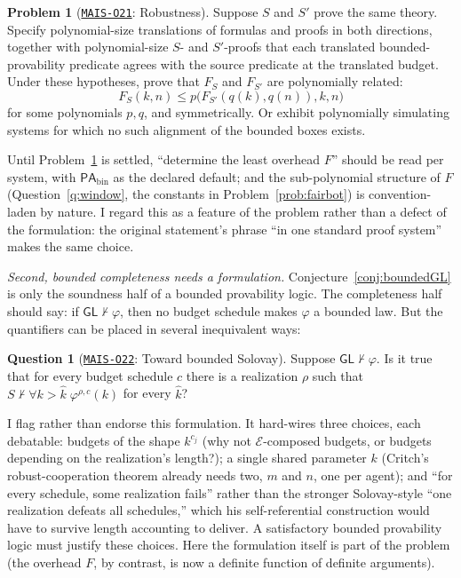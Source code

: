 \documentclass[11pt]{amsart}
\newcommand{\Oid}[1]{\href{https://github.com/lionellevine/MAIS/blob/main/open-problems/MAIS-O#1.md}{\texttt{MAIS-O#1}}}
\theoremstyle{plain}
\theoremstyle{definition}
\newtheorem{problem}[theorem]{Problem}
\newtheorem{question}[theorem]{Question}
\newcommand{\PAbin}{\mathsf{PA}_{\mathrm{bin}}}
\newcommand{\GL}{\mathsf{GL}}
\begin{document}
\begin{problem}[\Oid{21}: Robustness]
\label{prob:robust}
Suppose $S$ and $S'$ prove the same theory. Specify polynomial-size translations of formulas and proofs in both directions, together with polynomial-size $S$- and $S'$-proofs that each translated bounded-provability predicate agrees with the source predicate at the translated budget. Under these hypotheses, prove that $F_S$ and $F_{S'}$ are polynomially related:
\[
F_S(k,n)\le p\bigl(F_{S'}(q(k),q(n)),k,n\bigr)
\]
for some polynomials $p,q$, and symmetrically. Or exhibit polynomially simulating systems for which no such alignment of the bounded boxes exists.
\end{problem}

Until Problem~\ref{prob:robust} is settled, ``determine the least overhead $F$'' should be read per system, with $\PAbin$ as the declared default; and the sub-polynomial structure of $F$ (Question~\ref{q:window}, the constants in Problem~\ref{prob:fairbot}) is convention-laden by nature. I regard this as a feature of the problem rather than a defect of the formulation: the original statement's phrase ``in one standard proof system'' makes the same choice.

\emph{Second, bounded completeness needs a formulation.} Conjecture~\ref{conj:boundedGL} is only the soundness half of a bounded provability logic. The completeness half should say: if $\GL \nvdash \varphi$, then no budget schedule makes $\varphi$ a bounded law. But the quantifiers can be placed in several inequivalent ways:

\begin{question}[\Oid{22}: Toward bounded Solovay]
\label{q:solovay}
Suppose $\GL \nvdash \varphi$. Is it true that for every budget schedule $c$ there is a realization $\rho$ such that $S \nvdash \forall k>\hat{k}\;\varphi^{\rho,c}(k)$ for every $\hat{k}$?
\end{question}

I flag rather than endorse this formulation. It hard-wires three choices, each debatable: budgets of the shape $k^{c_j}$ (why not $\mathcal{E}$-composed budgets, or budgets depending on the realization's length?); a single shared parameter $k$ (Critch's robust-cooperation theorem already needs two, $m$ and $n$, one per agent); and ``for every schedule, some realization fails'' rather than the stronger Solovay-style ``one realization defeats all schedules,'' which his self-referential construction would have to survive length accounting to deliver. A satisfactory bounded provability logic must justify these choices. Here the formulation itself is part of the problem (the overhead $F$, by contrast, is now a definite function of definite arguments).
\end{document}
